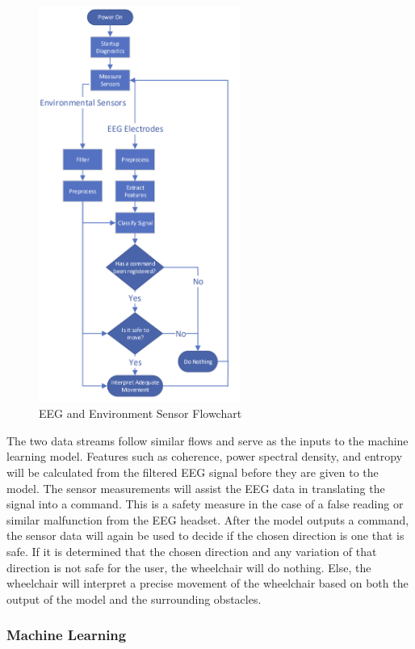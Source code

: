 \documentclass[conference]{IEEEtran}
\begin{document}
         \begin{figure}[htbp]
            \centering
            \includegraphics[height=5.1in, keepaspectratio]{figs/D/software-flowchart.png}
            \caption{EEG and Environment Sensor Flowchart}
            \label{fig:eeg_and_sensor}
        \end{figure}
            
        The two data streams follow similar flows and serve as the inputs to the machine learning model. Features such as coherence, power spectral density, and entropy will be calculated from the filtered EEG signal before they are given to the model. The sensor measurements will assist the EEG data in translating the signal into a command. This is a safety measure in the case of a false reading or similar malfunction from the EEG headset. After the model outputs a command, the sensor data will again be used to decide if the chosen direction is one that is safe. If it is determined that the chosen direction and any variation of that direction is not safe for the user, the wheelchair will do nothing. Else, the wheelchair will interpret a precise movement of the wheelchair based on both the output of the model and the surrounding obstacles. 

        \subsubsection{Machine Learning}
\end{document}
